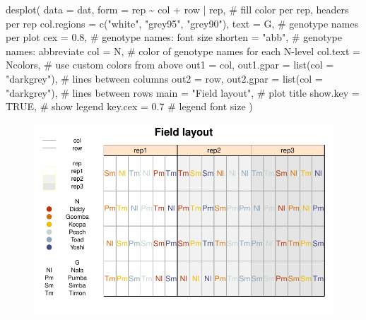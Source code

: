\documentclass[
  letterpaper,
  DIV=11,
  numbers=noendperiod]{scrartcl}
\newenvironment{Shaded}{\begin{snugshade}}{\end{snugshade}}
\newcommand{\AttributeTok}[1]{\textcolor[rgb]{0.40,0.45,0.13}{#1}}
\newcommand{\CommentTok}[1]{\textcolor[rgb]{0.37,0.37,0.37}{#1}}
\newcommand{\ConstantTok}[1]{\textcolor[rgb]{0.56,0.35,0.01}{#1}}
\newcommand{\FloatTok}[1]{\textcolor[rgb]{0.68,0.00,0.00}{#1}}
\newcommand{\FunctionTok}[1]{\textcolor[rgb]{0.28,0.35,0.67}{#1}}
\newcommand{\NormalTok}[1]{\textcolor[rgb]{0.00,0.23,0.31}{#1}}
\newcommand{\SpecialCharTok}[1]{\textcolor[rgb]{0.37,0.37,0.37}{#1}}
\newcommand{\StringTok}[1]{\textcolor[rgb]{0.13,0.47,0.30}{#1}}
\begin{document}
\begin{Shaded}
\begin{Highlighting}[]
\FunctionTok{desplot}\NormalTok{(}
  \AttributeTok{data =}\NormalTok{ dat,}
  \AttributeTok{form =}\NormalTok{ rep }\SpecialCharTok{\textasciitilde{}}\NormalTok{ col }\SpecialCharTok{+}\NormalTok{ row }\SpecialCharTok{|}\NormalTok{ rep, }\CommentTok{\# fill color per rep, headers per rep}
  \AttributeTok{col.regions =} \FunctionTok{c}\NormalTok{(}\StringTok{"white"}\NormalTok{, }\StringTok{"grey95"}\NormalTok{, }\StringTok{"grey90"}\NormalTok{),}
  \AttributeTok{text =}\NormalTok{ G, }\CommentTok{\# genotype names per plot}
  \AttributeTok{cex =} \FloatTok{0.8}\NormalTok{, }\CommentTok{\# genotype names: font size}
  \AttributeTok{shorten =} \StringTok{"abb"}\NormalTok{, }\CommentTok{\# genotype names: abbreviate}
  \AttributeTok{col =}\NormalTok{ N, }\CommentTok{\# color of genotype names for each N{-}level}
  \AttributeTok{col.text =}\NormalTok{ Ncolors, }\CommentTok{\# use custom colors from above}
  \AttributeTok{out1 =}\NormalTok{ col, }\AttributeTok{out1.gpar =} \FunctionTok{list}\NormalTok{(}\AttributeTok{col =} \StringTok{"darkgrey"}\NormalTok{), }\CommentTok{\# lines between columns}
  \AttributeTok{out2 =}\NormalTok{ row, }\AttributeTok{out2.gpar =} \FunctionTok{list}\NormalTok{(}\AttributeTok{col =} \StringTok{"darkgrey"}\NormalTok{), }\CommentTok{\# lines between rows}
  \AttributeTok{main =} \StringTok{"Field layout"}\NormalTok{, }\CommentTok{\# plot title}
  \AttributeTok{show.key =} \ConstantTok{TRUE}\NormalTok{, }\CommentTok{\# show legend}
  \AttributeTok{key.cex =} \FloatTok{0.7} \CommentTok{\# legend font size}
\NormalTok{  )}
\end{Highlighting}
\end{Shaded}

\begin{figure}[H]

{\centering \includegraphics{splitplot_gomezgomez1984_files/figure-pdf/unnamed-chunk-10-1.pdf}

}

\end{figure}
\end{document}
